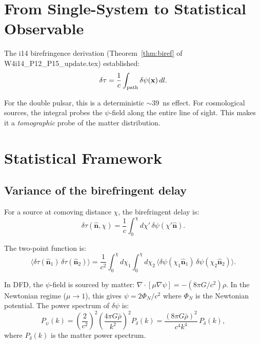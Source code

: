 \documentclass[11pt]{article}
\begin{document}
\section{From Single-System to Statistical Observable}

The i14 birefringence derivation (Theorem~\ref{thm:biref} of
W4i14\_P12\_P15\_update.tex) established:
\begin{equation}
\delta\tau = \frac{1}{c}\int_{\rm path}\delta\psi(\mathbf{x})\,dl.
\end{equation}

For the double pulsar, this is a deterministic $\sim 39$~ns effect.
For cosmological sources, the integral probes the $\psi$-field
along the entire line of sight. This makes it a \emph{tomographic}
probe of the matter distribution.

\section{Statistical Framework}

\subsection{Variance of the birefringent delay}

For a source at comoving distance $\chi$, the birefringent delay is:
\begin{equation}
\delta\tau(\hat{\mathbf{n}}, \chi) = \frac{1}{c}
\int_0^\chi d\chi'\,\delta\psi(\chi'\hat{\mathbf{n}}).
\end{equation}

The two-point function is:
\begin{equation}
\langle\delta\tau(\hat{\mathbf{n}}_1)\,\delta\tau(\hat{\mathbf{n}}_2)\rangle
= \frac{1}{c^2}\int_0^\chi d\chi_1\int_0^\chi d\chi_2\,
\langle\delta\psi(\chi_1\hat{\mathbf{n}}_1)\,
\delta\psi(\chi_2\hat{\mathbf{n}}_2)\rangle.
\end{equation}

In DFD, the $\psi$-field is sourced by matter: $\nabla\cdot[\mu\nabla\psi]
= -(8\pi G/c^2)\rho$. In the Newtonian regime ($\mu \to 1$), this gives
$\psi = 2\Phi_N/c^2$ where $\Phi_N$ is the Newtonian potential. The
power spectrum of $\delta\psi$ is:
\begin{equation}
P_\psi(k) = \left(\frac{2}{c^2}\right)^2
\left(\frac{4\pi G \bar{\rho}}{k^2}\right)^2 P_\delta(k)
= \frac{(8\pi G \bar{\rho})^2}{c^4 k^4}\,P_\delta(k),
\end{equation}
where $P_\delta(k)$ is the matter power spectrum.
\end{document}
